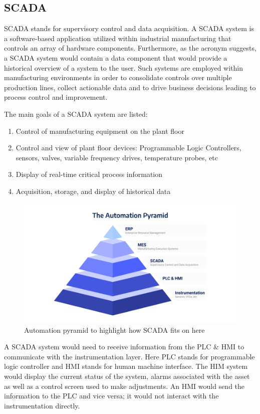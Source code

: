 \subsection{SCADA}
SCADA stands for supervisory control and data acquisition. A SCADA system is a software-based application utilized within industrial manufacturing that controls an array of hardware components. Furthermore, as the acronym suggests, a SCADA system would contain a data component that would provide a historical overview of a system to the user. Such systems are employed within manufacturing environments in order to consolidate controls over multiple production lines, collect actionable data and to drive business decisions leading to process control and improvement.

The main goals of a SCADA system are listed:
\begin{enumerate}
    \item Control of manufacturing equipment on the plant floor
    \item Control and view of plant floor devices: Programmable Logic Controllers, sensors, valves, variable frequency drives, temperature probes, etc
    \item Display of real-time critical process information
    \item Acquisition, storage, and display of historical data
\end{enumerate}
 
\begin{figure}[H]
    \includegraphics[scale=0.45]{figs/auto_pyramid.png}
    \caption{Automation pyramid to highlight how SCADA fits on here}
\end{figure}
A SCADA system would need to receive information from the PLC \& HMI to communicate with the instrumentation layer. Here PLC stands for programmable logic controller and HMI stands for human machine interface. The HIM system would display the current status of the system, alarms associated with the asset as well as a control screen used to make adjustments. An HMI would send the information to the PLC and vice versa; it would not interact with the instrumentation directly.


